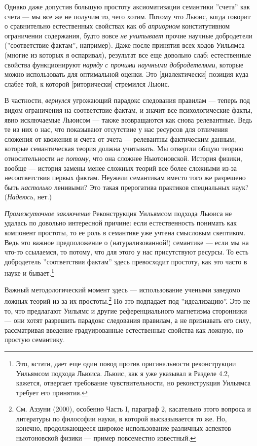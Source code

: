 \documentclass[11pt]{book}
\begin{document}
Однако даже допустив большую простоту аксиоматизации семантики ''счета'' как счета --- мы все же не получим то, чего хотим. Потому что Льюис, когда говорит о сравнительно естественных свойствах как об \textit{априорном} конститутивном ограничении содержания, будто вовсе \textit{не учитывает} прочие научные добродетели (''соответствие фактам'', например). Даже после принятия всех ходов Уильямса (многие из которых я оспаривал), результат все еще довольно слаб: естественные свойства функционируют \textit{наряду с прочими научными добродетелями}, которые можно использовать для оптимальной оценки. Это [диалектически] позиция куда слабее той, к которой [риторически] стремился Льюис.

В частности, \textit{вернулся} угрожающий парадокс следования правилам --- теперь под видом ограничения на соответствие фактам, и значит все психологические факты, явно исключаемые Льюисом --- также возвращаются как снова релевантные. Ведь те из них о нас, что показывают отсутствие у нас ресурсов для отличения сложения от квожения и счета от зчета --- релевантны фактическим данным, которые семантическая теория должна учитывать. Мы отвергли общую теорию относительности \textit{не потому}, что она сложнее Ньютоновской. История физики, вообще --- история замены менее сложных теорий все более сложными из-за несоответствия первых фактам. Неужели семантикам вместо того же разрешено быть \textit{настолько} ленивыми? Это такая прерогатива практиков специальных наук? (\textit{Надеюсь}, нет.)

\textit{Промежуточное заключение} \quad Реконструкция Уильямсом подхода Льюиса не удалась по довольно интересной причине: если естественность понимать как компонент простоты, то ее роль в семантике уже учтена смысловым скептиком. Ведь это важное предположение о (натурализованной!) семантике --- если мы на что-то ссылаемся, то потому, что для этого у нас присутствуют ресурсы. То есть добродетель ''соответствия фактам'' здесь превосходит простоту, как это часто в науке и бывает.\footnote{Это, кстати, дает еще один повод против оригинальности реконструкции Уильямсом подхода Льюиса. Льюис, как я уже указывал в Разделе 4.2, кажется, отвергает требование чувствительности, но реконструкция Уильямса требует его принятия.}

Важный методологический момент здесь --- использование учеными заведомо ложных теорий из-за их простоты.\footnote{См. Аззуни (2000), особенно Часть I, параграф 2, касательно этого вопроса и литературы по философии науки, в которой высказывается то же. Но, конечно, продолжающееся широкое использование различных аспектов ньютоновской физики --- пример повсеместно известный.} Но это подпадает под ''идеализацию''. Это не то, что предлагают Уильямс и другие референциального магнетизма сторонники --- они хотят разрешить парадокс следования правилам, а не признавать его силу, рассматривая введение градуированные естественные свойства как ложную, но простую семантику.
\end{document}
